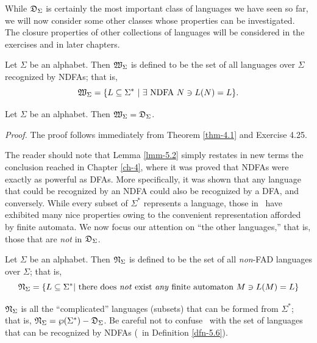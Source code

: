 While $\mathfrak{D}_\Sigma$ is certainly the most important class of languages we have seen so
far, we will now consider some other classes whose properties can be
investigated. The closure properties of other collections of languages will be
considered in the exercises and in later chapters.

\begin{dfn}\label{dfn-5.6}
Let $\Sigma$ be an alphabet. Then $\mathfrak{W}_\Sigma$ is defined to be the set of all
languages over $\Sigma$ recognized by NDFAs; that is,
\[ \mathfrak{W}_\Sigma =\{L \subseteq \Sigma^* \ |\ \exists \text{ NDFA } N \ni L(N)
	= L\}.\]
\end{dfn}

\begin{lmm}\label{lmm-5.2}
Let $\Sigma$ be an alphabet. Then $\mathfrak{W}_\Sigma = \mathfrak{D}_\Sigma$.

\emph{Proof.} The proof follows immediately from Theorem \ref{thm-4.1} and Exercise 4.25.
\end{lmm}

The reader should note that Lemma \ref{lmm-5.2} simply restates in new terms the
conclusion reached in Chapter \ref{ch-4}, where it was proved that NDFAs were exactly
as powerful as DFAs. More specifically, it was shown that any language that
could be recognized by an NDFA could also be recognized by a DFA, and conversely.
While every subset of $\Sigma^*$ represents a language, those in \DSIG\ have
exhibited many nice properties owing to the convenient representation afforded
by finite automata. We now focus our attention on ``the other languages,'' that
is, those that are \emph{not} in $\mathfrak{D}_\Sigma$.

\begin{dfn}\label{dfn-5.7}
Let $\Sigma$ be an alphabet. Then $\mathfrak{N}_\Sigma$ is defined to be the set of all
\emph{non}-FAD languages over $\Sigma$; that is,
\[ \mathfrak{N}_\Sigma =\{L \subseteq \Sigma^*| \text{ there does \emph{not} exist \emph{any} finite
automaton } M \ni L(M) = L\} \]
\end{dfn}

$\mathfrak{N}_\Sigma$ is all the ``complicated'' languages (subsets) that can be formed from
$\Sigma^*$; that is, $\mathfrak{N}_\Sigma = \wp(\Sigma^*) - \mathfrak{D}_\Sigma$. Be careful not to confuse
\NSIG\ with the set of languages that can be recognized by NDFAs (\WSIG\ in
Definition \ref{dfn-5.6}).

